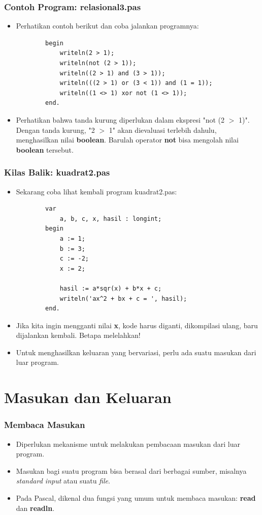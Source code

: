 \documentclass{beamer}
\begin{document}
\begin{frame}[fragile]
\frametitle{Contoh Program: relasional3.pas}
\begin{itemize}
	\item Perhatikan contoh berikut dan coba jalankan programnya:
	\begin{lstlisting}
		begin
		    writeln(2 > 1);
		    writeln(not (2 > 1));
		    writeln((2 > 1) and (3 > 1));
		    writeln(((2 > 1) or (3 < 1)) and (1 = 1));
		    writeln((1 <> 1) xor not (1 <> 1));
		end.
	\end{lstlisting}
	\item Perhatikan bahwa tanda kurung diperlukan dalam ekspresi "not (2 $>$ 1)". Dengan tanda kurung, "2 $>$ 1" akan dievaluasi terlebih dahulu, menghasilkan nilai \textbf{boolean}. Barulah operator \textbf{not} bisa mengolah nilai \textbf{boolean} tersebut.
\end{itemize}
\end{frame}

\begin{frame}[fragile]
\frametitle{Kilas Balik: kuadrat2.pas}
\begin{itemize}
	\item Sekarang coba lihat kembali program kuadrat2.pas:
	\begin{lstlisting}
		var
		    a, b, c, x, hasil : longint;
		begin
		    a := 1;
		    b := 3;
		    c := -2;
		    x := 2;	    

		    hasil := a*sqr(x) + b*x + c;
		    writeln('ax^2 + bx + c = ', hasil);
		end.
	\end{lstlisting}
	\item Jika kita ingin mengganti nilai \textbf{x}, kode harus diganti, dikompilasi ulang, baru dijalankan kembali. Betapa melelahkan!
	\item Untuk menghasilkan keluaran yang bervariasi, perlu ada \newline suatu masukan dari luar program.
\end{itemize}
\end{frame}

\section{Masukan dan Keluaran}
\frame{\sectionpage}

\begin{frame}
\frametitle{Membaca Masukan}
\begin{itemize}	
	\item Diperlukan mekanisme untuk melakukan pembacaan masukan dari luar program.
	\item Masukan bagi suatu program bisa berasal dari berbagai sumber, misalnya \textit{standard input} atau suatu \textit{file}.
	\item Pada Pascal, dikenal dua fungsi yang umum untuk membaca masukan: \alert{\textbf{read}} dan \alert{\textbf{readln}}.
\end{itemize}
\end{frame}
\end{document}

